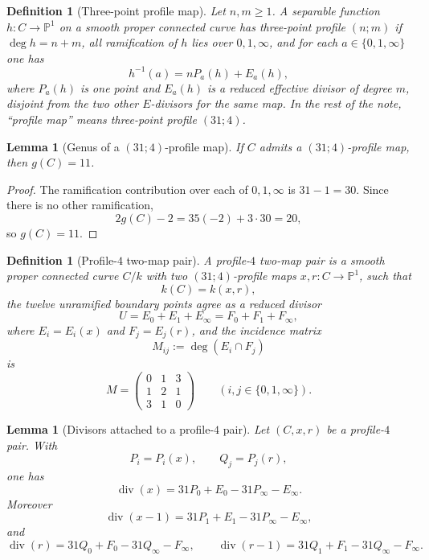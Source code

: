 \documentclass[11pt]{amsart}
\newtheorem{lemma}[theorem]{Lemma}
\newtheorem{definition}[theorem]{Definition}
\newcommand{\PP}{\mathbb P}
\newcommand{\Div}{\operatorname{div}}
\begin{document}
\begin{definition}[Three-point profile map]
\label{def:one-profile-map}
Let \(n,m\ge 1\).  A separable function \(h:C\to\PP^1\) on a smooth proper
connected curve has three-point profile \((n;m)\) if \(\deg h=n+m\), all
ramification of \(h\) lies over \(0,1,\infty\), and for each
\(a\in\{0,1,\infty\}\) one has
\[
  h^{-1}(a)=nP_a(h)+E_a(h),
\]
where \(P_a(h)\) is one point and \(E_a(h)\) is a reduced effective divisor of
degree \(m\), disjoint from the two other \(E\)-divisors for the same map.
In the rest of the note, ``profile map'' means three-point profile
\((31;4)\).
\end{definition}

\begin{lemma}[Genus of a \((31;4)\)-profile map]
\label{lem:profile-genus}
If \(C\) admits a \((31;4)\)-profile map, then \(g(C)=11\).
\end{lemma}

\begin{proof}
The ramification contribution over each of \(0,1,\infty\) is \(31-1=30\).
Since there is no other ramification,
\[
  2g(C)-2=35(-2)+3\cdot 30=20,
\]
so \(g(C)=11\).
\end{proof}

\begin{definition}[Profile-\(4\) two-map pair]
\label{def:profile4-pair}
A profile-\(4\) two-map pair is a smooth proper connected curve \(C/k\) with
two \((31;4)\)-profile maps \(x,r:C\to\PP^1\), such that
\[
  k(C)=k(x,r),
\]
the twelve unramified boundary points agree as a reduced divisor
\[
  U=E_0+E_1+E_\infty=F_0+F_1+F_\infty,
\]
where \(E_i=E_i(x)\) and \(F_j=E_j(r)\), and the incidence matrix
\[
  M_{ij}:=\deg(E_i\cap F_j)
\]
is
\[
  M=
  \begin{pmatrix}
  0&1&3\\
  1&2&1\\
  3&1&0
  \end{pmatrix}
  \qquad (i,j\in\{0,1,\infty\}).
\]
\end{definition}

\begin{lemma}[Divisors attached to a profile-\(4\) pair]
\label{lem:profile-divisors}
Let \((C,x,r)\) be a profile-\(4\) pair.  With
\[
  P_i=P_i(x),\qquad Q_j=P_j(r),
\]
one has
\[
 \Div(x)=31P_0+E_0-31P_\infty-E_\infty.
\]
Moreover
\[
 \Div(x-1)=31P_1+E_1-31P_\infty-E_\infty,
\]
and
\[
 \Div(r)=31Q_0+F_0-31Q_\infty-F_\infty,\qquad
 \Div(r-1)=31Q_1+F_1-31Q_\infty-F_\infty.
\]
\end{lemma}
\end{document}
